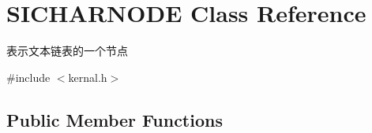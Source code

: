 \hypertarget{class_s_i_c_h_a_r_n_o_d_e}{}\section{S\+I\+C\+H\+A\+R\+N\+O\+DE Class Reference}
\label{class_s_i_c_h_a_r_n_o_d_e}


表示文本链表的一个节点~\newline
 




{\ttfamily \#include $<$kernal.\+h$>$}

\subsection*{Public Member Functions}
